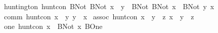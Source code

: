 \begin{isabellebody}
{}\ huntington{}\ {}hunt{}con\ {}BNot\ {}BNot\ x\ {}{}{}\ y{}\ {}{}{}\ BNot\ {}BNot\ x\ {}{}{}\ BNot\ y{}{}\ x{}\isanewline
{}\ comm{}\ {}hunt{}con\ {}x\ {}{}{}\ y{}\ {}y\ {}{}{}\ x{}{}\isanewline
{}\ assoc{}\ {}hunt{}con\ {}{}x\ {}{}{}\ y{}\ {}{}{}\ z{}\ {}x\ {}{}{}\ {}y\ {}{}{}\ z{}{}{}\isanewline
{}\ one{}\ {}hunt{}con\ {}x\ {}{}{}\ BNot\ x{}\ BOne{}\isanewline

\end{isabellebody}
